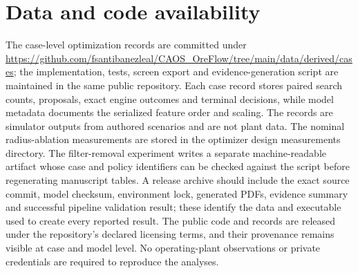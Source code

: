 \documentclass[10pt]{article}
\begin{document}
\section*{Data and code availability}
The case-level optimization records are committed under \url{https://github.com/fsantibanezleal/CAOS_OreFlow/tree/main/data/derived/cases}; the implementation, tests, screen export and evidence-generation script are maintained in the same public repository. Each case record stores paired search counts, proposals, exact engine outcomes and terminal decisions, while model metadata documents the serialized feature order and scaling. The records are simulator outputs from authored scenarios and are not plant data. The nominal radius-ablation measurements are stored in the optimizer design measurements directory. The filter-removal experiment writes a separate machine-readable artifact whose case and policy identifiers can be checked against the script before regenerating manuscript tables. A release archive should include the exact source commit, model checksum, environment lock, generated PDFs, evidence summary and successful pipeline validation result; these identify the data and executable used to create every reported result. The public code and records are released under the repository's declared licensing terms, and their provenance remains visible at case and model level. No operating-plant observations or private credentials are required to reproduce the analyses.
\end{document}

